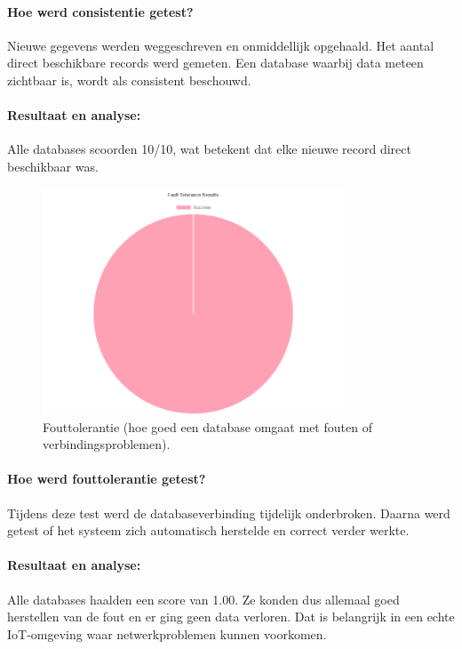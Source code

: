 \paragraph{Hoe werd consistentie getest?}
Nieuwe gegevens werden weggeschreven en onmiddellijk opgehaald. Het aantal direct beschikbare records werd gemeten. Een database waarbij data meteen zichtbaar is, wordt als consistent beschouwd.

\paragraph{Resultaat en analyse:}
Alle databases scoorden 10/10, wat betekent dat elke nieuwe record direct beschikbaar was.

\begin{figure}[H]
    \centering
    \includegraphics[width=0.8\textwidth]{Fault_Tolerance.png}
    \caption{Fouttolerantie (hoe goed een database omgaat met fouten of verbindingsproblemen).}
    \label{fig:fault-tolerance-comparison}
\end{figure}

\paragraph{Hoe werd fouttolerantie getest?}
Tijdens deze test werd de databaseverbinding tijdelijk onderbroken. Daarna werd getest of het systeem zich automatisch herstelde en correct verder werkte.

\paragraph{Resultaat en analyse:}
Alle databases haalden een score van 1.00. Ze konden dus allemaal goed herstellen van de fout en er ging geen data verloren. Dat is belangrijk in een echte IoT-omgeving waar netwerkproblemen kunnen voorkomen.

